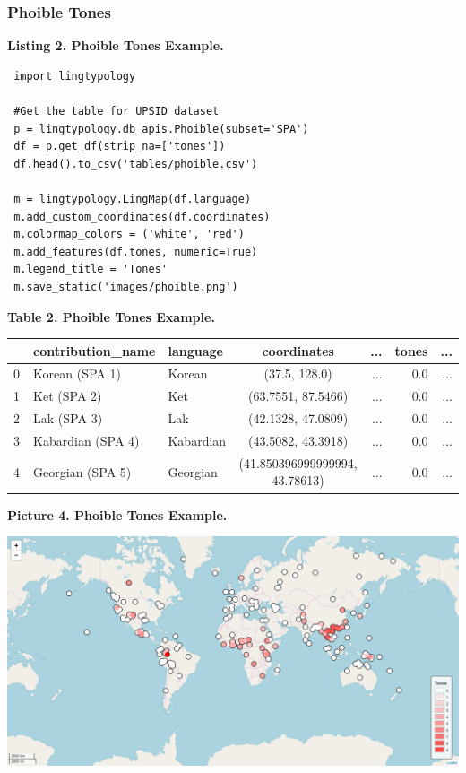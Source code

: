 \documentclass[a4paper,12pt]{article}
\begin{document}
\subsubsection{Phoible Tones}

\textbf{Listing 2. Phoible Tones Example.}
\begin{lstlisting}
 import lingtypology

 #Get the table for UPSID dataset
 p = lingtypology.db_apis.Phoible(subset='SPA')
 df = p.get_df(strip_na=['tones'])
 df.head().to_csv('tables/phoible.csv')
 
 m = lingtypology.LingMap(df.language)
 m.add_custom_coordinates(df.coordinates)
 m.colormap_colors = ('white', 'red')
 m.add_features(df.tones, numeric=True)
 m.legend_title = 'Tones'
 m.save_static('images/phoible.png')
\end{lstlisting}

\textbf{Table 2. Phoible Tones Example.}

\begin{adjustbox}{max width=\textwidth}
\begin{tabular}{ l | l | l | c | r | r | r }
    ~ & contribution\_name & language & coordinates & ... & tones & ... \\
    \hline
    0 & Korean (SPA 1) & Korean & (37.5, 128.0) & ... & 0.0 & ... \\
    1 & Ket (SPA 2) & Ket & (63.7551, 87.5466) & ... & 0.0 & ... \\
    2 & Lak (SPA 3) & Lak & (42.1328, 47.0809) & ... & 0.0 & ... \\
    3 & Kabardian (SPA 4) & Kabardian & (43.5082, 43.3918) & ... & 0.0 & ... \\
    4 & Georgian (SPA 5) & Georgian & (41.850396999999994, 43.78613) & ... & 0.0 & ... \\
\end{tabular}
\end{adjustbox}

\bigskip

\begin{samepage}
\textbf{Picture 4. Phoible Tones Example.}\nopagebreak

\includegraphics[width=\textwidth]{images/phoible.png}
\end{samepage}
\end{document}
